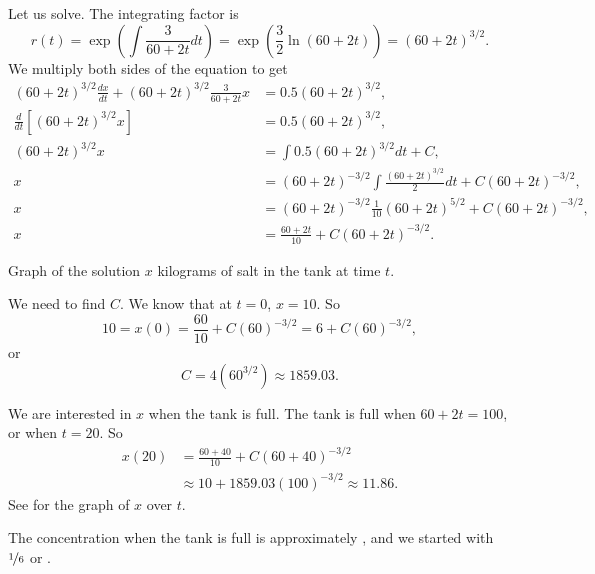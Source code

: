 \begin{example}
Let us solve.  The integrating factor is
\begin{equation*}
r(t) = \exp \left( \int \frac{3}{60+2t} dt  \right)
=
\exp \left( \frac{3}{2} \ln (60+2t) \right)
=
{(60+2t)}^{3/2} .
\end{equation*}
We multiply both sides of the equation to get
\begin{align*}
{(60+2t)}^{3/2} \frac{dx}{dt} +
{(60+2t)}^{3/2} \frac{3}{60+2t} x
& =
0.5{(60+2t)}^{3/2} ,\\
\frac{d}{dt}\left[
{(60+2t)}^{3/2} x \right]
& =
0.5{(60+2t)}^{3/2} ,\\
{(60+2t)}^{3/2} x
& =
\int 
0.5{(60+2t)}^{3/2}
dt
+C ,\\
 x
& =
{(60+2t)}^{-3/2} \int 
\frac{
{(60+2t)}^{3/2}
}{2}
dt
+C{(60+2t)}^{-3/2} ,\\
 x
& =
{(60+2t)}^{-3/2}
\frac{1}{10}{(60+2t)}^{5/2}
+C{(60+2t)}^{-3/2} ,\\
 x
& =
\frac{60+2t}{10}
+C{(60+2t)}^{-3/2} .
\end{align*}

\begin{mywrapfig}{3.25in}
\capstart
{}
\caption{Graph of the solution $x$ kilograms of salt in the tank at time
$t$.\label{linear-salt-graph:fig}}
\end{mywrapfig}
%
%
We need to find $C$.  We know that at $t=0$, $x=10$.  So
\begin{equation*}
10 = x(0)
=
\frac{60}{10}
+C{(60)}^{-3/2}
=
6
+C{(60)}^{-3/2} ,
\end{equation*}
or
\begin{equation*}
C=4 ({60}^{3/2}) \approx 1859.03 .
\end{equation*}

We are interested in $x$ when the tank is full.  The tank is
full when $60+2t = 100$, or when $t=20$.  So
\begin{equation*}
\begin{split}
x(20) & = 
\frac{60+40}{10}
+C{(60+40)}^{-3/2}
\\
& \approx
10
+1859.03 {(100)}^{-3/2}
\approx
11.86 .
\end{split}
\end{equation*}
See  for the graph of $x$ over $t$.

The concentration when the tank is full is approximately
, and we started
with $\nicefrac{1}{6}$ or .
\end{example}

